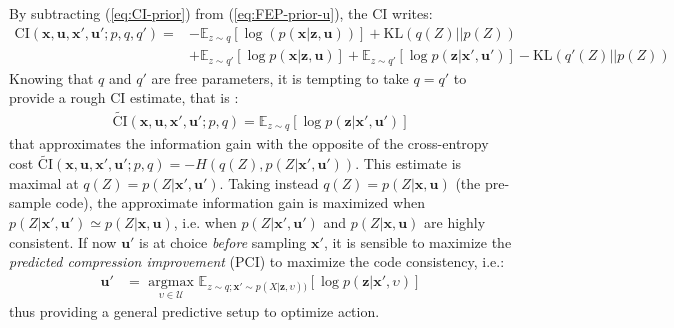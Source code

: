 \documentclass{article}
\begin{document}
By subtracting (\ref{eq:CI-prior}) from (\ref{eq:FEP-prior-u}), the CI writes:
\begin{align}
\text{CI}(\boldsymbol{x},\boldsymbol{u}, \boldsymbol{x}', \boldsymbol{u}';p,q,q')=
&  - \mathbb{E}_{z\sim q} \left[\log (p(\boldsymbol{x}|\boldsymbol{z},\boldsymbol{u}))\right] +\text{KL}(q(Z)||p(Z))\nonumber\\
& + \mathbb{E}_{z\sim q'} \left[\log p(\boldsymbol{x}|\boldsymbol{z}, \boldsymbol{u})\right] 
+ \mathbb{E}_{z\sim q'} \left[\log p(\boldsymbol{z}|\boldsymbol{x}', \boldsymbol{u}')\right] -\text{KL}(q'(Z)||p(Z))
\end{align} 
Knowing that $q$ and $q'$ are free parameters, it is tempting to take $q=q'$ to provide a rough CI estimate, that is :
\begin{align}
\tilde{\text{CI}}(\boldsymbol{x},\boldsymbol{u}, \boldsymbol{x}', \boldsymbol{u}';p, q) = \mathbb{E}_{z\sim q} \left[\log p(\boldsymbol{z}|\boldsymbol{x}', \boldsymbol{u}')\right]\label{eq:PCI}
\end{align}
that approximates the information gain with the opposite of the cross-entropy cost $\tilde{\text{CI}}(\boldsymbol{x},\boldsymbol{u}, \boldsymbol{x}', \boldsymbol{u}';p, q) = -H(q(Z),p(Z|\boldsymbol{x}', \boldsymbol{u}'))$.
This estimate is maximal at $q(Z) = p(Z|\boldsymbol{x}', \boldsymbol{u}')$. 
Taking instead $q(Z)= p(Z|\boldsymbol{x}, \boldsymbol{u})$ (the pre-sample code), the 
approximate information gain is maximized when $p(Z|\boldsymbol{x}', \boldsymbol{u}')\simeq p(Z|\boldsymbol{x}, \boldsymbol{u})$, i.e. when $p(Z|\boldsymbol{x}', \boldsymbol{u}')$ and $p(Z|\boldsymbol{x}, \boldsymbol{u})$ are highly consistent. If now $\boldsymbol{u}'$ is at choice \emph{before} sampling  $\boldsymbol{x}'$, it is sensible to maximize the \emph{predicted compression improvement} (PCI) to maximize the code consistency, i.e.:
\begin{align}
\boldsymbol{u}' 
&= \underset{\upsilon \in \mathcal{U}}{\text{ argmax }} \mathbb{E}_{z\sim q; \boldsymbol{x}'\sim p(X|\boldsymbol{z},\upsilon))} 
\left[\log p(\boldsymbol{z}|\boldsymbol{x}', \upsilon)\right]
\end{align}
thus providing a general predictive setup to optimize action.
\end{document}
